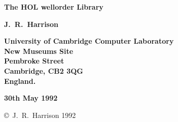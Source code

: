 
\begin{titlepage}

\setcounter{page}{1}                      %


\mbox{}
\vskip20mm
\begin{center}
{\Huge\bf The HOL wellorder Library}
\end{center}


\vskip15mm
\begin{center}
\large\bf J.\ R.\ Harrison
\end{center}


\vfill
\begin{center}
\bf
University of Cambridge Computer Laboratory\\
New Museums Site\\
Pembroke Street\\
Cambridge, {\small\bf CB}2 3{\small\bf QG}\\
England.
\end{center}


\vskip5mm
\begin{center}
\bf 30th May 1992
\end{center}

\end{titlepage}

\thispagestyle{empty}
\mbox{}

\vfill
\begin{center}
\copyright\ J.\ R.\ Harrison 1992
\end{center}
\newpage
